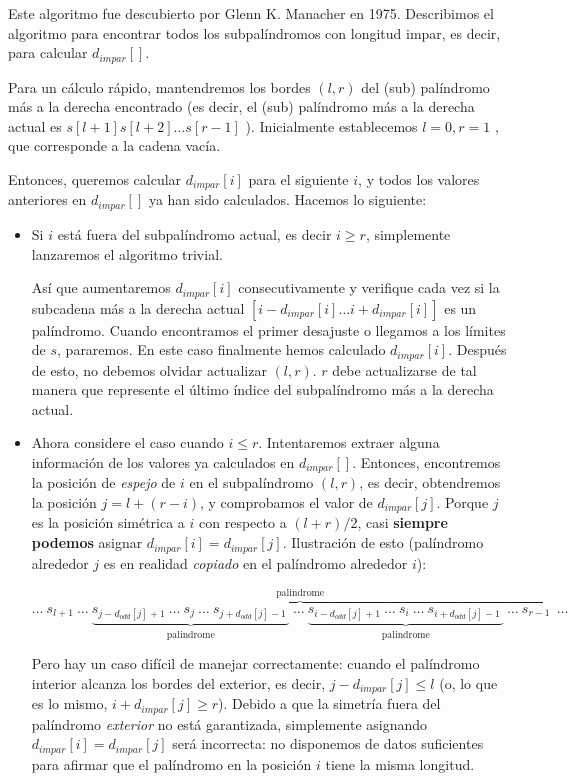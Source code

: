 Este algoritmo fue descubierto por Glenn K. Manacher en 1975. Describimos el algoritmo para encontrar todos los subpalíndromos con longitud impar, es decir, para calcular $d_{impar}[]$.

Para un cálculo rápido, mantendremos los bordes $(l,r)$ del (sub) palíndromo más a la derecha encontrado (es decir, el (sub) palíndromo más a la derecha actual es $s[l+1] s[l+2] \dots s[r-1]$ ). Inicialmente establecemos $l = 0, r = 1$ , que corresponde a la cadena vacía.

Entonces, queremos calcular $d_{impar}[i]$ para el siguiente $i$, y todos los valores anteriores en $d_{impar}[]$ ya han sido calculados. Hacemos lo siguiente:


\begin{itemize}
	\item Si $i$ está fuera del subpalíndromo actual, es decir $i \geq r$, simplemente lanzaremos el algoritmo trivial.
	
	Así que aumentaremos $d_{impar}[i]$ consecutivamente y verifique cada vez si la subcadena más a la derecha actual $[i - d_{impar}[i]\dots i + d_{impar}[i]]$ es un palíndromo. Cuando encontramos el primer desajuste o llegamos a los límites de $s$, pararemos. En este caso finalmente hemos calculado $d_{impar}[i]$. Después de esto, no debemos olvidar actualizar $(l,r)$. $r$ debe actualizarse de tal manera que represente el último índice del subpalíndromo más a la derecha actual.
	
	\item Ahora considere el caso cuando $i \le r$. Intentaremos extraer alguna información de los valores ya calculados en $d_{impar}[]$. Entonces, encontremos la posición de \emph{espejo} de $i$ en el subpalíndromo $(l,r)$, es decir, obtendremos la posición $j=l+(r-i)$, y comprobamos el valor de $d_{impar}[j]$. Porque $j$ es la posición simétrica a $i$ con respecto a $(l+r)/2$, casi \textbf{siempre podemos} asignar $d_{impar}[i] = d_{impar}[j]$. Ilustración de esto (palíndromo alrededor $j$ es en realidad \emph{copiado} en el palíndromo alrededor $i$):
	
	$$ \ldots\ \overbrace{ s_{l+1}\ \ldots\ \underbrace{ s_{j-d_{odd}[j]+1}\ \ldots\ s_j\ \ldots\ s_{j+d_{odd}[j]-1}\ }_\text{palindrome}\ \ldots\ \underbrace{ s_{i-d_{odd}[j]+1}\ \ldots\ s_i\ \ldots\ s_{i+d_{odd}[j]-1}\ }_\text{palindrome}\ \ldots\ s_{r-1}\ }^\text{palindrome}\ \ldots $$
	
	Pero hay un caso difícil de manejar correctamente: cuando el palíndromo interior alcanza los bordes del exterior, es decir, $j - d_{impar}[j] \le l$ (o, lo que es lo mismo, $i + d_{impar}[j] \ge r$). Debido a que la simetría fuera del palíndromo \emph{exterior} no está garantizada, simplemente asignando $d_{impar}[i] = d_{impar}[j]$ será incorrecta: no disponemos de datos suficientes para afirmar que el palíndromo en la posición $i$ tiene la misma longitud.
	

\end{itemize}
